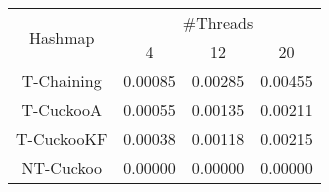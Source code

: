 \begin{tabular}{|c|c|c|c|}
\hline
\multirow{2}{*}{Hashmap} & \multicolumn{3}{c|}{\#Threads}\\\cline{2-4}& 4 & 12 & 20\\
\hline
\hline
T-Chaining & 0.00085 & 0.00285 & 0.00455\\
T-CuckooA & 0.00055 & 0.00135 & 0.00211\\
T-CuckooKF & 0.00038 & 0.00118 & 0.00215\\
NT-Cuckoo & 0.00000 & 0.00000 & 0.00000\\
\hline
\end{tabular}
